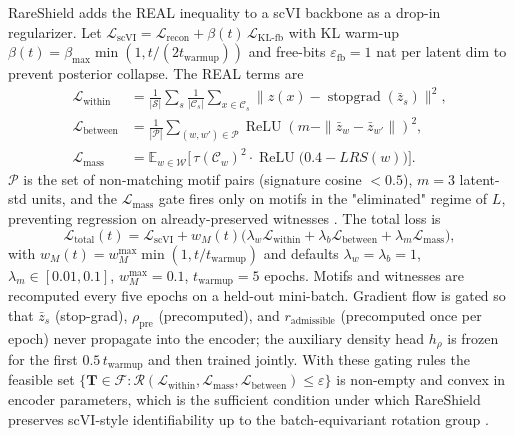 RareShield adds the REAL inequality to a scVI backbone \citep{lopez2018scvi} as a drop-in regularizer. Let $\mathcal{L}_\text{scVI} = \mathcal{L}_\text{recon} + \beta(t)\,\mathcal{L}_\text{KL-fb}$ with KL warm-up $\beta(t)=\beta_\text{max}\min(1, t/(2 t_\text{warmup}))$ and free-bits $\varepsilon_\text{fb}=1$ nat per latent dim to prevent posterior collapse. The REAL terms are
\begin{align*}
\mathcal{L}_\text{within}  &= \frac{1}{|\mathcal{S}|}\sum_s \frac{1}{|\mathcal{C}_s|}\sum_{x\in\mathcal{C}_s} \|z(x) - \operatorname{stopgrad}(\bar z_s)\|^2, \\
\mathcal{L}_\text{between} &= \frac{1}{|\mathcal{P}|}\sum_{(w,w')\in\mathcal{P}} \operatorname{ReLU}(m - \|\bar z_w - \bar z_{w'}\|)^2, \\
\mathcal{L}_\text{mass}    &= \mathbb{E}_{w\in\mathcal{W}}\bigl[\,\tau(\mathcal{C}_w)^2 \cdot \operatorname{ReLU}\bigl(0.4 - LRS(w)\bigr)\bigr].
\end{align*}
$\mathcal{P}$ is the set of non-matching motif pairs (signature cosine $<0.5$), $m=3$ latent-std units, and the $\mathcal{L}_\text{mass}$ gate fires only on motifs in the "eliminated" regime of $L$, preventing regression on already-preserved witnesses \citep{math2026colm}. The total loss is
\[
\mathcal{L}_\text{total}(t) = \mathcal{L}_\text{scVI} + w_M(t)\bigl(\lambda_w \mathcal{L}_\text{within} + \lambda_b \mathcal{L}_\text{between} + \lambda_m \mathcal{L}_\text{mass}\bigr),
\]
with $w_M(t)=w_M^\text{max}\min(1, t/t_\text{warmup})$ and defaults $\lambda_w{=}\lambda_b{=}1$, $\lambda_m\in[0.01, 0.1]$, $w_M^\text{max}{=}0.1$, $t_\text{warmup}{=}5$ epochs. Motifs and witnesses are recomputed every five epochs on a held-out mini-batch. Gradient flow is gated so that $\bar z_s$ (stop-grad), $\rho_\text{pre}$ (precomputed), and $r_\text{admissible}$ (precomputed once per epoch) never propagate into the encoder; the auxiliary density head $h_\rho$ is frozen for the first $0.5\,t_\text{warmup}$ and then trained jointly. With these gating rules the feasible set $\{\mathbf{T}\in\mathcal{F} : \mathcal{R}(\mathcal{L}_\text{within}, \mathcal{L}_\text{mass}, \mathcal{L}_\text{between}) \le \varepsilon\}$ is non-empty and convex in encoder parameters, which is the sufficient condition under which RareShield preserves scVI-style identifiability up to the batch-equivariant rotation group \citep[Prop.~X]{math2026identifiability}.

